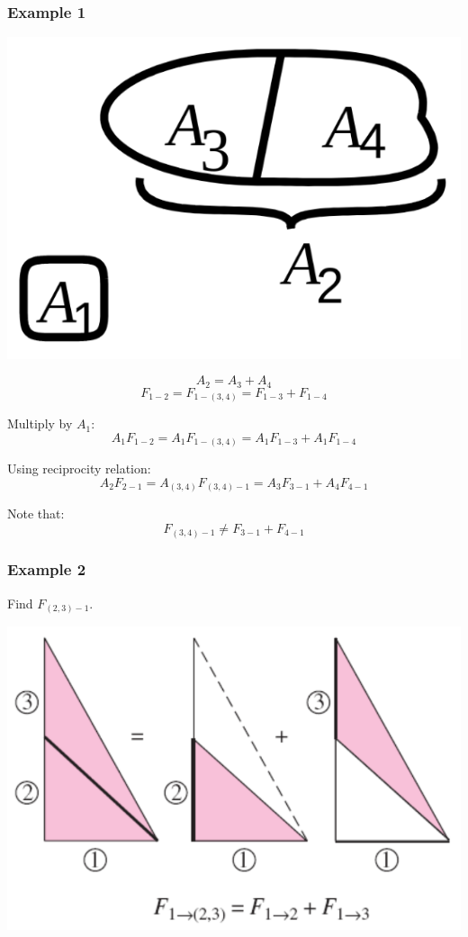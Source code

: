 \documentclass[11pt]{article}
\begin{document}
\subsubsection{Example 1}
\label{sec:orgf7954a8}
\begin{center}
\includegraphics[width=.9\linewidth]{./images/superposition-rule-example-1-diagram.png}
\end{center}
\[A_2 = A_3 + A_4\]
\[F_{1-2} = F_{1-(3, 4)} = F_{1-3} + F_{1-4}\]

Multiply by \(A_1\):
\[A_1 F_{1-2} = A_1 F_{1-(3, 4)} = A_1 F_{1-3} + A_1 F_{1-4}\]

Using reciprocity relation:
\[A_2 F_{2-1} = A_{(3, 4)} F_{(3, 4)-1} = A_3 F_{3-1} + A_4 F_{4-1}\]

Note that:
\[F_{(3, 4)-1} \ne F_{3-1} + F_{4-1}\]

 \newpage

\subsubsection{Example 2}
\label{sec:org420b171}
Find \(F_{(2, 3)-1}\).
\begin{center}
\includegraphics[width=.9\linewidth]{./images/superposition-rule-diagram.png}
\end{center}
\end{document}
